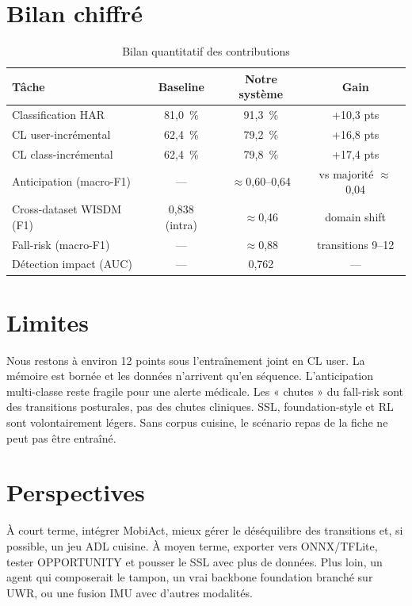 \section{Bilan chiffré}

\begin{table}[H]
\centering
\small
\begin{tabularx}{0.92\textwidth}{|Y|c|c|c|}
\hline
\textbf{Tâche} & \textbf{Baseline} & \textbf{Notre système} & \textbf{Gain} \\
\hline
Classification HAR       & 81,0~\% & 91,3~\% & +10,3 pts \\
CL user-incrémental        & 62,4~\% & 79,2~\% & +16,8 pts \\
CL class-incrémental       & 62,4~\% & 79,8~\% & +17,4 pts \\
Anticipation (macro-F1)    & —       & $\approx$0,60--0,64 & vs majorité $\approx$0,04 \\
Cross-dataset WISDM (F1)   & 0,838 (intra) & $\approx$0,46 & domain shift \\
Fall-risk (macro-F1)       & —       & $\approx$0,88 & transitions 9--12 \\
Détection impact (AUC)     & —       & 0,762   & — \\
\hline
\end{tabularx}
\caption{Bilan quantitatif des contributions}
\label{tab:bilan_conclusion}
\end{table}

\section{Limites}

Nous restons à environ 12 points sous l'entraînement joint en CL user. La
mémoire est bornée et les données n'arrivent qu'en séquence. L'anticipation
multi-classe reste fragile pour une alerte médicale. Les « chutes » du
fall-risk sont des transitions posturales, pas des chutes cliniques. SSL,
foundation-style et RL sont volontairement légers. Sans corpus cuisine, le
scénario repas de la fiche ne peut pas être entraîné.

\section{Perspectives}

À court terme, intégrer MobiAct, mieux gérer le déséquilibre des transitions
et, si possible, un jeu ADL cuisine. À moyen terme, exporter vers ONNX/TFLite,
tester OPPORTUNITY et pousser le SSL avec plus de données. Plus loin, un
agent qui composerait le tampon, un vrai backbone foundation
\parencite{yuan2024} branché sur UWR, ou une fusion IMU avec d'autres
modalités.

